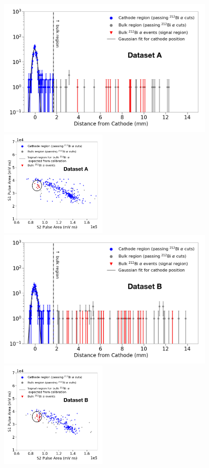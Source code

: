 \begin{figure}[hbtp]
\centering
\includegraphics[width=4.3in]{figures/radon/hist_a_label.png} \includegraphics[width=2.1in]{figures/radon/signalregion_a_label.png}\\
\includegraphics[width=4.3in]{figures/radon/hist_b_label.png} \includegraphics[width=2.1in]{figures/radon/signalregion_b_label.png}\\

\end{figure}
